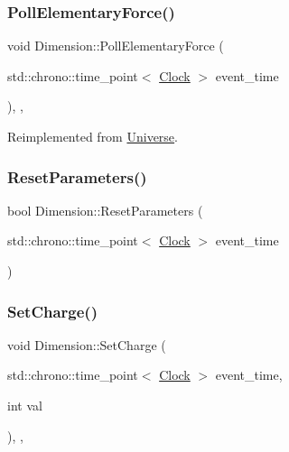 \mbox{\label{classDimension_a5b07f5c8558233c8f3488baf1fe3459a}} 
\subsubsection{\texorpdfstring{Poll\+Elementary\+Force()}{PollElementaryForce()}}
{\footnotesize\ttfamily void Dimension\+::\+Poll\+Elementary\+Force (\begin{DoxyParamCaption}\item[{std\+::chrono\+::time\+\_\+point$<$ \mbox{\hyperlink{universe_8h_a0ef8d951d1ca5ab3cfaf7ab4c7a6fd80}{Clock}} $>$}]{event\+\_\+time }\end{DoxyParamCaption})\hspace{0.3cm}{\ttfamily [inline]}, {\ttfamily [final]}, {\ttfamily [virtual]}}



Reimplemented from \mbox{\hyperlink{classUniverse_a0c485c504542409cbb5cfd8543c35b11}{Universe}}.

\mbox{\label{classDimension_af83732dba929ae01aca457e7d6121374}} 
\subsubsection{\texorpdfstring{Reset\+Parameters()}{ResetParameters()}}
{\footnotesize\ttfamily bool Dimension\+::\+Reset\+Parameters (\begin{DoxyParamCaption}\item[{std\+::chrono\+::time\+\_\+point$<$ \mbox{\hyperlink{universe_8h_a0ef8d951d1ca5ab3cfaf7ab4c7a6fd80}{Clock}} $>$}]{event\+\_\+time }\end{DoxyParamCaption})}

\mbox{\label{classDimension_a6d3f7fa4a26b92d8ae6161a1b8bb8220}} 
\subsubsection{\texorpdfstring{Set\+Charge()}{SetCharge()}}
{\footnotesize\ttfamily void Dimension\+::\+Set\+Charge (\begin{DoxyParamCaption}\item[{std\+::chrono\+::time\+\_\+point$<$ \mbox{\hyperlink{universe_8h_a0ef8d951d1ca5ab3cfaf7ab4c7a6fd80}{Clock}} $>$}]{event\+\_\+time,  }\item[{int}]{val }\end{DoxyParamCaption})\hspace{0.3cm}{\ttfamily [inline]}, {\ttfamily [final]}, {\ttfamily [virtual]}}



